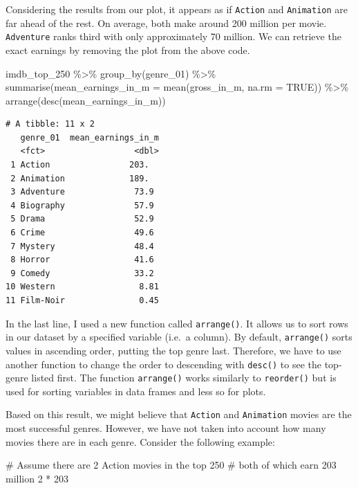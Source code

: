 \documentclass[
  letterpaper,
]{krantz}
\makeatletter
\newenvironment{Shaded}{\begin{snugshade}}{\end{snugshade}}
\newcommand{\AttributeTok}[1]{\textcolor[rgb]{0.40,0.45,0.13}{#1}}
\newcommand{\CommentTok}[1]{\textcolor[rgb]{0.37,0.37,0.37}{#1}}
\newcommand{\ConstantTok}[1]{\textcolor[rgb]{0.56,0.35,0.01}{#1}}
\newcommand{\DecValTok}[1]{\textcolor[rgb]{0.68,0.00,0.00}{#1}}
\newcommand{\FunctionTok}[1]{\textcolor[rgb]{0.28,0.35,0.67}{#1}}
\newcommand{\NormalTok}[1]{\textcolor[rgb]{0.00,0.23,0.31}{#1}}
\newcommand{\SpecialCharTok}[1]{\textcolor[rgb]{0.37,0.37,0.37}{#1}}
\newenvironment{kframe}{%
\medskip{}
\setlength{\fboxsep}{.8em}
 \def\at@end@of@kframe{}%
 \ifinner\ifhmode%
  \def\at@end@of@kframe{\end{minipage}}%
  \begin{minipage}{\columnwidth}%
 \fi\fi%
 \def\FrameCommand##1{\hskip\@totalleftmargin \hskip-\fboxsep
 \colorbox{shadecolor}{##1}\hskip-\fboxsep
     \hskip-\linewidth \hskip-\@totalleftmargin \hskip\columnwidth}%
 \MakeFramed {\advance\hsize-\width
   \@totalleftmargin\z@ \linewidth\hsize
   \@setminipage}}%
 {\par\unskip\endMakeFramed%
 \at@end@of@kframe}
\renewenvironment{Shaded}{\begin{kframe}}{\end{kframe}}
\makeatother
\begin{document}
Considering the results from our plot, it appears as if \texttt{Action}
and \texttt{Animation} are far ahead of the rest. On average, both make
around 200 million per movie. \texttt{Adventure} ranks third with only
approximately 70 million. We can retrieve the exact earnings by removing
the plot from the above code.

\begin{Shaded}
\begin{Highlighting}[]
\NormalTok{imdb\_top\_250 }\SpecialCharTok{\%\textgreater{}\%}
  \FunctionTok{group\_by}\NormalTok{(genre\_01) }\SpecialCharTok{\%\textgreater{}\%}
  \FunctionTok{summarise}\NormalTok{(}\AttributeTok{mean\_earnings\_in\_m =} \FunctionTok{mean}\NormalTok{(gross\_in\_m, }\AttributeTok{na.rm =} \ConstantTok{TRUE}\NormalTok{)) }\SpecialCharTok{\%\textgreater{}\%}
  \FunctionTok{arrange}\NormalTok{(}\FunctionTok{desc}\NormalTok{(mean\_earnings\_in\_m))}
\end{Highlighting}
\end{Shaded}

\begin{verbatim}
# A tibble: 11 x 2
   genre_01  mean_earnings_in_m
   <fct>                  <dbl>
 1 Action                203.  
 2 Animation             189.  
 3 Adventure              73.9 
 4 Biography              57.9 
 5 Drama                  52.9 
 6 Crime                  49.6 
 7 Mystery                48.4 
 8 Horror                 41.6 
 9 Comedy                 33.2 
10 Western                 8.81
11 Film-Noir               0.45
\end{verbatim}

In the last line, I used a new function called \texttt{arrange()}. It
allows us to sort rows in our dataset by a specified variable (i.e.~a
column). By default, \texttt{arrange()} sorts values in ascending order,
putting the top genre last. Therefore, we have to use another function
to change the order to descending with \texttt{desc()} to see the
top-genre listed first. The function \texttt{arrange()} works similarly
to \texttt{reorder()} but is used for sorting variables in data frames
and less so for plots.

Based on this result, we might believe that \texttt{Action} and
\texttt{Animation} movies are the most successful genres. However, we
have not taken into account how many movies there are in each genre.
Consider the following example:

\begin{Shaded}
\begin{Highlighting}[]
\CommentTok{\# Assume there are 2 Action movies in the top 250}
\CommentTok{\# both of which earn 203 million}
\DecValTok{2} \SpecialCharTok{*} \DecValTok{203}
\end{Highlighting}
\end{Shaded}
\end{document}
